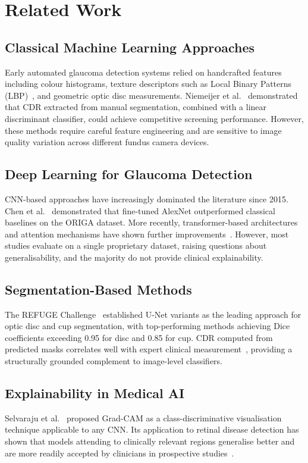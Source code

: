 \documentclass[conference]{IEEEtran}
\begin{document}
\section{Related Work}
 
\subsection{Classical Machine Learning Approaches}
Early automated glaucoma detection systems relied on handcrafted
features including colour histograms, texture descriptors such as
Local Binary Patterns (LBP)~\cite{ojala2002}, and geometric optic
disc measurements. Niemeijer et al.~\cite{niemeijer2007} demonstrated
that CDR extracted from manual segmentation, combined with a linear
discriminant classifier, could achieve competitive screening
performance. However, these methods require careful feature
engineering and are sensitive to image quality variation across
different fundus camera devices.
 
\subsection{Deep Learning for Glaucoma Detection}
CNN-based approaches have increasingly dominated the literature
since 2015. Chen et al.~\cite{chen2015} demonstrated that fine-tuned
AlexNet outperformed classical baselines on the ORIGA dataset.
More recently, transformer-based architectures and attention
mechanisms have shown further improvements~\cite{li2021}. However,
most studies evaluate on a single proprietary dataset, raising
questions about generalisability, and the majority do not provide
clinical explainability.
 
\subsection{Segmentation-Based Methods}
The REFUGE Challenge~\cite{orlando2020} established U-Net variants
as the leading approach for optic disc and cup segmentation, with
top-performing methods achieving Dice coefficients exceeding 0.95
for disc and 0.85 for cup. CDR computed from predicted masks
correlates well with expert clinical measurement~\cite{fumero2011},
providing a structurally grounded complement to image-level
classifiers.
 
\subsection{Explainability in Medical AI}
Selvaraju et al.~\cite{selvaraju2017} proposed Grad-CAM as a
class-discriminative visualisation technique applicable to any CNN.
Its application to retinal disease detection has shown that models
attending to clinically relevant regions generalise better and are
more readily accepted by clinicians in prospective
studies~\cite{jiang2019}.
 
\end{document}
